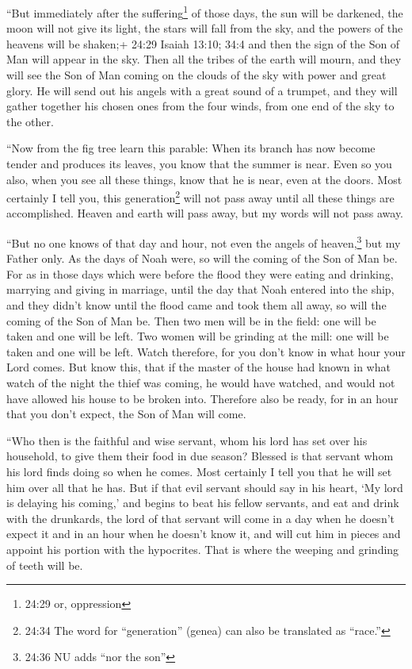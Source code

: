  ``But immediately after the suffering\footnote{24:29 or,
  oppression} of those days, the sun will be darkened, the moon will not
give its light, the stars will fall from the sky, and the powers of the
heavens will be shaken;+ 24:29 Isaiah 13:10; 34:4  and then
the sign of the Son of Man will appear in the sky. Then all the tribes
of the earth will mourn, and they will see the Son of Man coming on the
clouds of the sky with power and great glory.  He will send
out his angels with a great sound of a trumpet, and they will gather
together his chosen ones from the four winds, from one end of the sky to
the other.

 ``Now from the fig tree learn this parable: When its
branch has now become tender and produces its leaves, you know that the
summer is near.  Even so you also, when you see all these
things, know that he is near, even at the doors.  Most
certainly I tell you, this generation\footnote{24:34 The word for
  ``generation'' (genea) can also be translated as ``race.''} will not
pass away until all these things are accomplished.  Heaven
and earth will pass away, but my words will not pass away.

 ``But no one knows of that day and hour, not even the
angels of heaven,\footnote{24:36 NU adds ``nor the son''} but my Father
only.  As the days of Noah were, so will the coming of the
Son of Man be.  For as in those days which were before the
flood they were eating and drinking, marrying and giving in marriage,
until the day that Noah entered into the ship,  and they
didn't know until the flood came and took them all away, so will the
coming of the Son of Man be.  Then two men will be in the
field: one will be taken and one will be left.  Two women
will be grinding at the mill: one will be taken and one will be left.
 Watch therefore, for you don't know in what hour your Lord
comes.  But know this, that if the master of the house had
known in what watch of the night the thief was coming, he would have
watched, and would not have allowed his house to be broken into.
 Therefore also be ready, for in an hour that you don't
expect, the Son of Man will come.

 ``Who then is the faithful and wise servant, whom his lord
has set over his household, to give them their food in due season?
 Blessed is that servant whom his lord finds doing so when
he comes.  Most certainly I tell you that he will set him
over all that he has.  But if that evil servant should say
in his heart, `My lord is delaying his coming,'  and begins
to beat his fellow servants, and eat and drink with the drunkards,
 the lord of that servant will come in a day when he
doesn't expect it and in an hour when he doesn't know it, 
and will cut him in pieces and appoint his portion with the hypocrites.
That is where the weeping and grinding of teeth will be.

